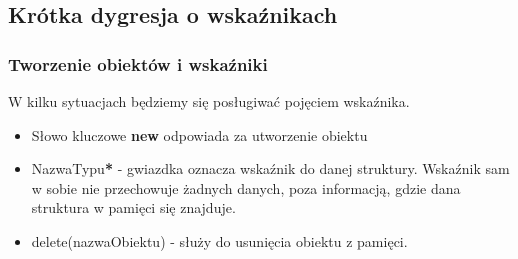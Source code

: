 \documentclass[slidestop,compress,mathserif]{beamer}
\begin{document}
%
%
%
\subsection{Krótka dygresja o wskaźnikach}
\begin{frame}
 \frametitle{Tworzenie obiektów i wskaźniki}
 W kilku sytuacjach będziemy się posługiwać pojęciem wskaźnika. 
 \begin{itemize}
 \pause
 \item Słowo kluczowe \textbf{new} odpowiada za utworzenie obiektu
 \pause
 \item NazwaTypu\textbf{*} - gwiazdka oznacza wskaźnik do danej struktury. Wskaźnik sam w sobie nie przechowuje żadnych danych, poza informacją, gdzie dana struktura w pamięci się znajduje.
 \pause
 \item delete(nazwaObiektu) - służy do usunięcia obiektu z pamięci.
\end{itemize}
\pause
\testcode
\end{frame}
\end{document}
